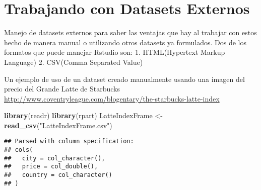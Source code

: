 \documentclass[]{article}
\title{}
\author{}
\date{}
\newenvironment{Shaded}{\begin{snugshade}}{\end{snugshade}}
\newcommand{\DataTypeTok}[1]{\textcolor[rgb]{0.13,0.29,0.53}{#1}}
\newcommand{\DecValTok}[1]{\textcolor[rgb]{0.00,0.00,0.81}{#1}}
\newcommand{\FloatTok}[1]{\textcolor[rgb]{0.00,0.00,0.81}{#1}}
\newcommand{\KeywordTok}[1]{\textcolor[rgb]{0.13,0.29,0.53}{\textbf{#1}}}
\newcommand{\NormalTok}[1]{#1}
\newcommand{\OperatorTok}[1]{\textcolor[rgb]{0.81,0.36,0.00}{\textbf{#1}}}
\newcommand{\OtherTok}[1]{\textcolor[rgb]{0.56,0.35,0.01}{#1}}
\newcommand{\StringTok}[1]{\textcolor[rgb]{0.31,0.60,0.02}{#1}}
\begin{document}
\hypertarget{trabajando-con-datasets-externos}{%
\section{Trabajando con Datasets
Externos}\label{trabajando-con-datasets-externos}}

Manejo de datasets externos para saber las ventajas que hay al trabajar
con estos hecho de manera manual o utilizando otros datasets ya
formulados. Dos de los formatos que puede manejar Rstudio son: 1.
HTML(Hypertext Markup Language) 2. CSV(Comma Separated Value)

Un ejemplo de uso de un dataset creado manualmente usando una imagen del
precio del Grande Latte de Starbucks
\url{http://www.coventryleague.com/blogentary/the-starbucks-latte-index}

\begin{Shaded}
\begin{Highlighting}[]
\KeywordTok{library}\NormalTok{(readr)}
\KeywordTok{library}\NormalTok{(rpart)}
\NormalTok{LatteIndexFrame <-}\StringTok{ }\KeywordTok{read_csv}\NormalTok{(}\StringTok{"LatteIndexFrame.csv"}\NormalTok{)}
\end{Highlighting}
\end{Shaded}

\begin{verbatim}
## Parsed with column specification:
## cols(
##   city = col_character(),
##   price = col_double(),
##   country = col_character()
## )
\end{verbatim}

\begin{Shaded}
\end{Shaded}
\end{document}
